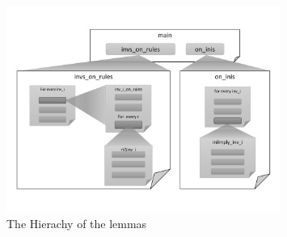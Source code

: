 \documentclass{llncs-new}
\newlength{\fminilength}
\newenvironment{fmini}[1][\linewidth]
  {\setlength{\fminilength}{#1\fboxsep-2\fboxrule}%
   \vspace{2ex}\noindent\begin{lrbox}{\fminibox}\begin{minipage}{\fminilength}%
   \mbox{ }\hfill\vspace{-2.5ex}}%
  {\end{minipage}\end{lrbox}\vspace{1ex}\hspace{0ex}%
   \framebox{\usebox{\fminibox}}}
\newenvironment{specification}
{\noindent\scriptsize
\tt\begin{fmini}\begin{tabbing}X\=X12345\=XXXX\=XXXX\=XXXX\=XXXX\=XXXX
\=\+\kill} {\end{tabbing}\normalfont\end{fmini}}
\newcommand{\forget}[1]{}
\def \pInv {i}
\begin{document}
\vspace{-30pt}

\begin{figure}[htbp]
\centering %
\includegraphics[width=0.8\textwidth]{thy.pdf}
\vspace{-20pt}
\caption{The Hierachy of the lemmas\label{fig:lemmaHierachy}
}
\end{figure}

\vspace{-20pt}
\forget{\begin{specification}
definition inv1::"nat $\Rightarrow$ nat $\Rightarrow$ formula" where [simp]:\\
"inv1 \pInv0 \pInv1 $\equiv$
(neg (andForm (eqn (IVar (Field (Para (Field (Ident ''Sta'') ''Proc'') \pInv1)\\ ''CacheState''))\\
 (Const CACHE\_E)) (eqn (IVar (Field (Para (Field (Ident ''Sta'') ''Proc'') \pInv0)\\ ''CacheState'')) (Const CACHE\_E))))"\\
definition invariants::"nat $\Rightarrow$ formula set" where [simp]:\\
"invariants N $\equiv$ \{f.
($\exists$ pInv0 pInv1. pInv0$\le$N$\wedge$pInv1$\le$N$\wedge$pInv0~=pInv1$\wedge$f=inv1  pInv0 pInv1) $\vee$\\
($\exists$ pInv0. pInv0 $\le$N$\wedge$f=inv2  pInv0) $\vee$
(f=inv3  ) $\vee$ ......\\
($\exists$ pInv0. pInv0$\le$N$\wedge$f=inv162  pInv0) \}"
\end{specification}}

\end{document}
